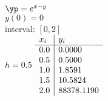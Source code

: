 {
$\yp = e^{x-y}$\\
$y(0)=0$\\
interval: $[0,2]$\\
$h = 0.5$
}
{
	$\begin{array}{l | l}
		x_i & y_i    \\ \hline
		0.0 & 0.0000 \\
		0.5 & 0.5000 \\
		1.0 & 1.8591 \\
		1.5 & 10.5824 \\
		2.0 & 88378.1190 \\
	\end{array}$
}